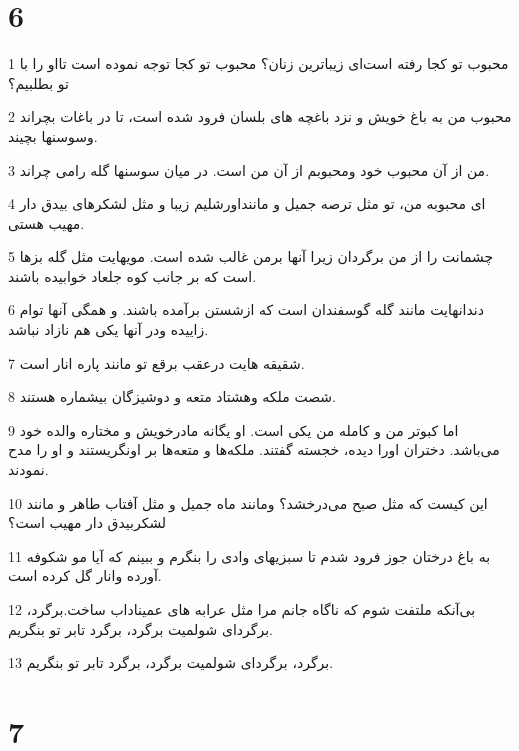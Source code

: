 \chapter{6}

\par 1 محبوب تو کجا رفته است‌ای زیباترین زنان؟ محبوب تو کجا توجه نموده است تااو را با تو بطلبیم؟
\par 2 محبوب من به باغ خویش و نزد باغچه های بلسان فرود شده است، تا در باغات بچراند وسوسنها بچیند.
\par 3 من از آن محبوب خود ومحبوبم از آن من است. در میان سوسنها گله رامی چراند.
\par 4 ‌ای محبوبه من، تو مثل ترصه جمیل و ماننداورشلیم زیبا و مثل لشکرهای بیدق دار مهیب هستی.
\par 5 چشمانت را از من برگردان زیرا آنها برمن غالب شده است. مویهایت مثل گله بزها است که بر جانب کوه جلعاد خوابیده باشند.
\par 6 دندانهایت مانند گله گوسفندان است که ازشستن برآمده باشند. و همگی آنها توام زاییده ودر آنها یکی هم نازاد نباشد.
\par 7 شقیقه هایت درعقب برقع تو مانند پاره انار است.
\par 8 شصت ملکه وهشتاد متعه و دوشیزگان بیشماره هستند.
\par 9 اما کبوتر من و کامله من یکی است. او یگانه مادرخویش و مختاره والده خود می‌باشد. دختران اورا دیده، خجسته گفتند. ملکه‌ها و متعه‌ها بر اونگریستند و او را مدح نمودند.
\par 10 این کیست که مثل صبح می‌درخشد؟ ومانند ماه جمیل و مثل آفتاب طاهر و مانند لشکربیدق دار مهیب است؟
\par 11 به باغ درختان جوز فرود شدم تا سبزیهای وادی را بنگرم و ببینم که آیا مو شکوفه آورده وانار گل کرده است.
\par 12 بی‌آنکه ملتفت شوم که ناگاه جانم مرا مثل عرابه های عمیناداب ساخت.برگرد، برگرد‌ای شولمیت برگرد، برگرد تابر تو بنگریم.
\par 13 برگرد، برگرد‌ای شولمیت برگرد، برگرد تابر تو بنگریم.
 
\chapter{7}

